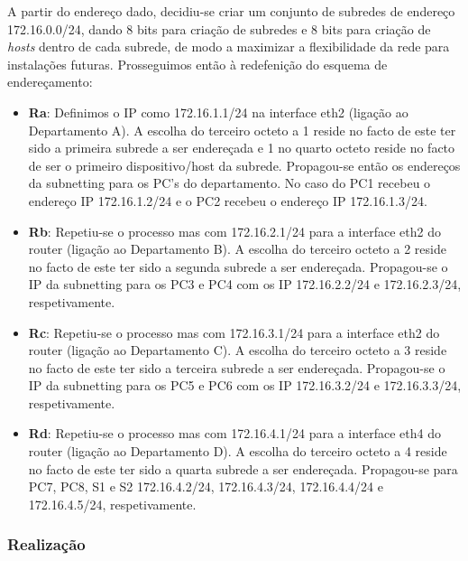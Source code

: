 \documentclass{llncs}
\begin{document}
\par A partir do endereço dado, decidiu-se criar um conjunto de subredes de endereço 172.16.0.0/24, dando 8 bits para criação de subredes e 8 bits para criação de \textit{hosts} dentro de cada subrede, de modo a maximizar a flexibilidade da rede para instalações futuras. Prosseguimos então à redefenição do esquema de endereçamento:
\begin{itemize}
\item \textbf{Ra}: Definimos o IP como 172.16.1.1/24 na interface eth2 (ligação ao Departamento A). A escolha do terceiro octeto a 1 reside no facto de este ter sido a primeira subrede a ser endereçada e 1 no quarto octeto reside no facto de ser o primeiro dispositivo/host da subrede. Propagou-se então os endereços da subnetting para os PC's do departamento. No caso do PC1 recebeu o endereço IP 172.16.1.2/24 e o PC2 recebeu o endereço IP 172.16.1.3/24.

\item \textbf{Rb}: Repetiu-se o processo mas com 172.16.2.1/24 para a interface eth2 do router (ligação ao Departamento B). A escolha do terceiro octeto a 2 reside no facto de este ter sido a segunda subrede a ser endereçada. Propagou-se o IP da subnetting para os PC3 e PC4 com os IP 172.16.2.2/24 e 172.16.2.3/24, respetivamente.

\item \textbf{Rc}: Repetiu-se o processo mas com 172.16.3.1/24 para a interface eth2 do router (ligação ao Departamento C). A escolha do terceiro octeto a 3 reside no facto de este ter sido a terceira subrede a ser endereçada. Propagou-se o IP da subnetting para os PC5 e PC6 com os IP 172.16.3.2/24 e 172.16.3.3/24, respetivamente.

\item \textbf{Rd}: Repetiu-se o processo mas com 172.16.4.1/24 para a interface eth4 do router (ligação ao Departamento D). A escolha do terceiro octeto a 4 reside no facto de este ter sido a quarta subrede a ser endereçada. Propagou-se para PC7, PC8, S1 e S2 172.16.4.2/24, 172.16.4.3/24, 172.16.4.4/24 e 172.16.4.5/24, respetivamente.

\end{itemize}

\subsubsection{Realização}\rule[-10pt]{0pt}{10pt}\\
\end{document}
